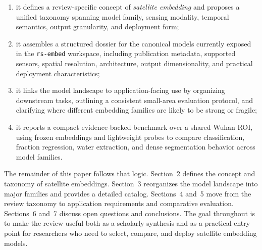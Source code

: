 \begin{enumerate}[leftmargin=1.6em,label=(\roman*)]
  \item it defines a review-specific concept of \emph{satellite embedding} and proposes a unified taxonomy spanning model family, sensing modality, temporal semantics, output granularity, and deployment form;
  \item it assembles a structured dossier for the \modelcount{} canonical models currently exposed in the \texttt{rs-embed} workspace, including publication metadata, supported sensors, spatial resolution, architecture, output dimensionality, and practical deployment characteristics;
  \item it links the model landscape to application-facing use by organizing downstream tasks, outlining a consistent small-area evaluation protocol, and clarifying where different embedding families are likely to be strong or fragile;
  \item it reports a compact evidence-backed benchmark over a shared Wuhan ROI, using frozen embeddings and lightweight probes to compare classification, fraction regression, water extraction, and dense segmentation behavior across model families.
\end{enumerate}

The remainder of this paper follows that logic. Section~2 defines the concept and taxonomy of satellite embeddings. Section~3 reorganizes the model landscape into major families and provides a detailed catalog. Sections~4 and~5 move from the review taxonomy to application requirements and comparative evaluation. Sections~6 and~7 discuss open questions and conclusions. The goal throughout is to make the review useful both as a scholarly synthesis and as a practical entry point for researchers who need to select, compare, and deploy satellite embedding models.
